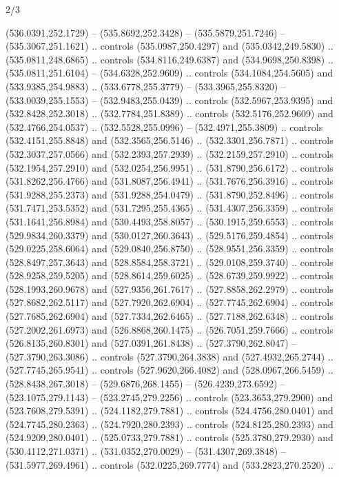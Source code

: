 \begin{flagdescription}{2/3}
\begin{scope}[xshift=0.5\flaglength,yshift=0.5\flagwidth,scale=\flagwidth/495.65]
\begin{scope}[y=0.8pt, x=0.8pt, yscale=-1,shift={(-463.76,-309.78)}]
  (536.0391,252.1729) -- (535.8692,252.3428) -- (535.5879,251.7246) --
  (535.3067,251.1621) .. controls (535.0987,250.4297) and (535.0342,249.5830) ..
  (535.0811,248.6865) .. controls (534.8116,249.6387) and (534.9698,250.8398) ..
  (535.0811,251.6104) -- (534.6328,252.9609) .. controls (534.1084,254.5605) and
  (533.9385,254.9883) .. (533.6778,255.3779) -- (533.3965,255.8320) --
  (533.0039,255.1553) -- (532.9483,255.0439) .. controls (532.5967,253.9395) and
  (532.8428,252.3018) .. (532.7784,251.8389) .. controls (532.5176,252.9609) and
  (532.4766,254.0537) .. (532.5528,255.0996) -- (532.4971,255.3809) .. controls
  (532.4151,255.8848) and (532.3565,256.5146) .. (532.3301,256.7871) .. controls
  (532.3037,257.0566) and (532.2393,257.2939) .. (532.2159,257.2910) .. controls
  (532.1954,257.2910) and (532.0254,256.9951) .. (531.8790,256.6172) .. controls
  (531.8262,256.4766) and (531.8087,256.4941) .. (531.7676,256.3916) .. controls
  (531.9288,255.2373) and (531.9288,254.0479) .. (531.8790,252.8496) .. controls
  (531.7471,253.5352) and (531.7295,255.4365) .. (531.4307,256.3359) .. controls
  (531.1641,256.8984) and (530.4493,258.8057) .. (530.1915,259.6553) .. controls
  (529.9834,260.3379) and (530.0127,260.3643) .. (529.5176,259.4854) .. controls
  (529.0225,258.6064) and (529.0840,256.8750) .. (528.9551,256.3359) .. controls
  (528.8497,257.3643) and (528.8584,258.3721) .. (529.0108,259.3740) .. controls
  (528.9258,259.5205) and (528.8614,259.6025) .. (528.6739,259.9922) .. controls
  (528.1993,260.9678) and (527.9356,261.7617) .. (527.8858,262.2979) .. controls
  (527.8682,262.5117) and (527.7920,262.6904) .. (527.7745,262.6904) .. controls
  (527.7685,262.6904) and (527.7334,262.6465) .. (527.7188,262.6348) .. controls
  (527.2002,261.6973) and (526.8868,260.1475) .. (526.7051,259.7666) .. controls
  (526.8135,260.8301) and (527.0391,261.8438) .. (527.3790,262.8047) --
  (527.3790,263.3086) .. controls (527.3790,264.3838) and (527.4932,265.2744) ..
  (527.7745,265.9541) .. controls (527.9620,266.4082) and (528.0967,266.5459) ..
  (528.8438,267.3018) -- (529.6876,268.1455) -- (526.4239,273.6592) --
  (523.1075,279.1143) -- (523.2745,279.2256) .. controls (523.3653,279.2900) and
  (523.7608,279.5391) .. (524.1182,279.7881) .. controls (524.4756,280.0401) and
  (524.7745,280.2363) .. (524.7920,280.2393) .. controls (524.8125,280.2393) and
  (524.9209,280.0401) .. (525.0733,279.7881) .. controls (525.3780,279.2930) and
  (530.4112,271.0371) .. (531.0352,270.0029) -- (531.4307,269.3848) --
  (531.5977,269.4961) .. controls (532.0225,269.7774) and (533.2823,270.2520) ..

\end{scope}
\end{scope}
\end{flagdescription}
